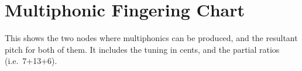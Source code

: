 \chapter{Multiphonic Fingering Chart}\label{app:Multiphonic Fingering Chart}
This shows the two nodes where multiphonics can be produced, and the resultant pitch for both of them.
It includes the tuning in cents, and the partial ratios (i.e.\ 7+13+6). 
